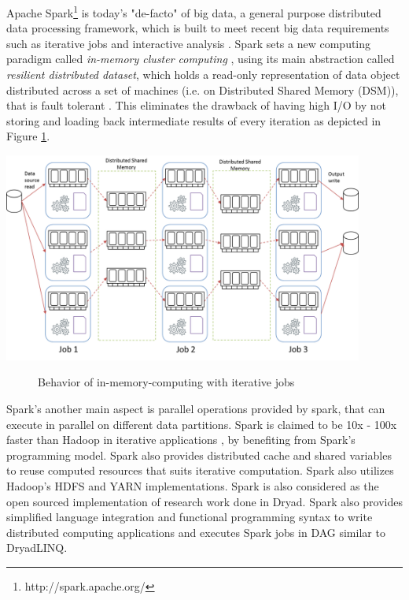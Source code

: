 Apache Spark\footnote{http://spark.apache.org/} is today's "de-facto" of big data, a general purpose distributed data processing framework, which is built to meet recent big data requirements such as iterative jobs and interactive analysis \cite{Spark}.  Spark sets a new computing paradigm called \textit{in-memory cluster computing} \cite{RDD} , using its main abstraction called \textit{resilient distributed dataset}, which holds a read-only representation of data object distributed across a set of machines (i.e. on Distributed Shared Memory (DSM)), that is fault tolerant \cite{RDD}. This eliminates the drawback of  having high I/O by not storing and loading back intermediate results of every iteration as depicted in Figure \ref{fig:in-memory-computing}.
 \begin{center}
	\includegraphics[width=32em]{./Figures/in-memory-computing}
	\begin{figure}[htbp]
    \caption{Behavior of in-memory-computing with iterative jobs}
    \label{fig:in-memory-computing}
	\end{figure}
\end{center}
Spark's another main aspect is parallel operations provided by spark, that can execute in parallel on different data partitions. Spark is claimed to be 10x - 100x faster than Hadoop in iterative applications \cite{Spark}\cite{RDD} \citep{clashoftitians}, by benefiting from Spark's programming model. Spark also provides distributed cache and shared variables to reuse computed resources that suits iterative computation. Spark also utilizes Hadoop's HDFS and YARN implementations. Spark is also considered as the open sourced implementation of research work done in Dryad. Spark also provides simplified language integration and functional programming syntax to write distributed computing applications \cite{Spark}\cite{Spark-improvements} and executes Spark jobs in DAG similar to DryadLINQ. 

